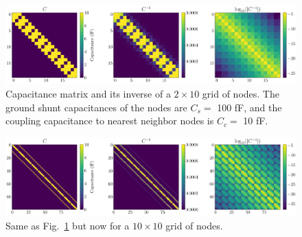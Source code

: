 \begin{figure}[h!]
    \centering
    \includegraphics[width=\textwidth]{figures/2x10_grid_cap.pdf}
    \caption{Capacitance matrix and its inverse of a $2\times 10$ grid of nodes. The ground shunt capacitances of the nodes are $C_s=$ 100 fF, and the coupling capacitance to nearest neighbor nodes is $C_c =$ 10 fF.}
    \label{fig:2x10_grid_cap}
\end{figure}

\begin{figure}[h!]
    \centering
    \includegraphics[width=\textwidth]{figures/10x10_grid_cap.pdf}
    \caption{Same as Fig.\ \ref{fig:2x10_grid_cap} but now for a $10 \times 10$ grid of nodes.}
    \label{fig:10x10_grid_cap}
\end{figure}